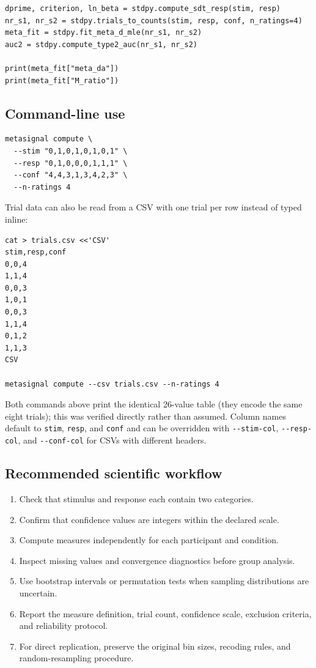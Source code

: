 \documentclass{article}
\providecommand{\tightlist}{\setlength{\itemsep}{0pt}\setlength{\parskip}{0pt}} %
\begin{document}
\begin{verbatim}
dprime, criterion, ln_beta = stdpy.compute_sdt_resp(stim, resp)
nr_s1, nr_s2 = stdpy.trials_to_counts(stim, resp, conf, n_ratings=4)
meta_fit = stdpy.fit_meta_d_mle(nr_s1, nr_s2)
auc2 = stdpy.compute_type2_auc(nr_s1, nr_s2)

print(meta_fit["meta_da"])
print(meta_fit["M_ratio"])
\end{verbatim}

\subsection{Command-line use}\label{command-line-use}

\begin{verbatim}
metasignal compute \
  --stim "0,1,0,1,0,1,0,1" \
  --resp "0,1,0,0,0,1,1,1" \
  --conf "4,4,3,1,3,4,2,3" \
  --n-ratings 4
\end{verbatim}

Trial data can also be read from a CSV with one trial per row instead of typed inline:

\begin{verbatim}
cat > trials.csv <<'CSV'
stim,resp,conf
0,0,4
1,1,4
0,0,3
1,0,1
0,0,3
1,1,4
0,1,2
1,1,3
CSV

metasignal compute --csv trials.csv --n-ratings 4
\end{verbatim}

Both commands above print the identical 26-value table (they encode the same eight trials); this was verified directly rather than assumed. Column names default to \texttt{stim}, \texttt{resp}, and \texttt{conf} and can be overridden with \texttt{-\/-stim-col}, \texttt{-\/-resp-col}, and \texttt{-\/-conf-col} for CSVs with different headers.

\subsection{Recommended scientific workflow}\label{recommended-scientific-workflow}

\begin{enumerate}
\def\labelenumi{\arabic{enumi}.}
\tightlist
\item
  Check that stimulus and response each contain two categories.
\item
  Confirm that confidence values are integers within the declared scale.
\item
  Compute measures independently for each participant and condition.
\item
  Inspect missing values and convergence diagnostics before group analysis.
\item
  Use bootstrap intervals or permutation tests when sampling distributions are uncertain.
\item
  Report the measure definition, trial count, confidence scale, exclusion criteria, and reliability protocol.
\item
  For direct replication, preserve the original bin sizes, recoding rules, and random-resampling procedure.
\end{enumerate}
\end{document}
